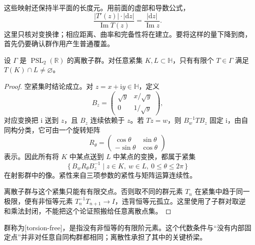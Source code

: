 \ProseParagraphBreak
这些映射还保持半平面的长度元。用前面的虚部和导数公式，
\[
 \frac{|T'(z)|\cdot|\mathrm{d}z|}{\operatorname{Im}T(z)}
 =\frac{|\mathrm{d}z|}{\operatorname{Im}z}.
\]
这里只核对变换律；相应距离、曲率和完备性将在建立。要将这样的量下降到商，首先仍要确认群作用产生普通覆盖。

\begin{proposition}[离散子群的紧集相交性质]\label{b3:prop:11-discrete-halfplane-action}
设 \(\Gamma\) 是 \(\operatorname{PSL}_2(\mathbb R)\) 的离散子群。对任意紧集 \(K,L\subset\mathbb H\)，只有有限个 \(T\in\Gamma\) 满足 \(T(K)\cap L\ne\varnothing\)。
\end{proposition}
\begin{proof}
空紧集时结论成立。对 \(z=x+\mathrm{i}y\in\mathbb H\)，定义
\[
 B_z=\begin{pmatrix}\sqrt y&x/\sqrt y\\0&1/\sqrt y\end{pmatrix},
\]
对应变换把 \(\mathrm{i}\) 送到 \(z\)，且 \(B_z\) 连续依赖于 \(z\)。若 \(Tz=w\)，则 \(B_w^{-1}TB_z\) 固定 \(\mathrm{i}\)，由自同构分类，它可由一个旋转矩阵
\[
 R_\theta=
 \begin{pmatrix}\cos\theta&\sin\theta\\-\sin\theta&\cos\theta\end{pmatrix}
\]
表示。因此所有将 \(K\) 中某点送到 \(L\) 中某点的变换，都属于紧集
\[
 \{\,B_wR_\theta B_z^{-1}\mid
       z\in K,\ w\in L,\ 0\le\theta\le2\pi\,\}
\]
在射影群中的像。紧性来自三项参数的紧性与矩阵运算连续性。

离散子群与这个紧集只能有有限交点。否则取不同的群元素 \(T_n\) 在紧集中趋于同一极限，便有非恒等元素 \(T_n^{-1}T_{n+1}\to I\)，违背恒等元孤立。这里使用了子群对取逆和乘法封闭，不能把这个论证照搬给任意离散点集。
\end{proof}
群称为[torsion-free]，是指没有非恒等的有限阶元素。这个代数条件与“没有内部固定点”并非对任意自同构群都相同；离散性承担了其中的关键桥梁。

